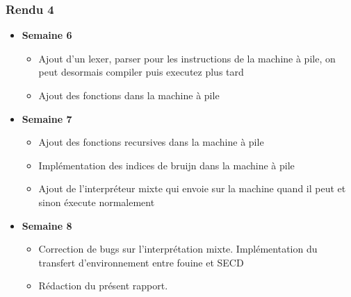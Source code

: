\subsubsection*{Rendu 4}
\begin{itemize}
  \item \textbf{Semaine 6 }
    \begin{itemize}
      \item Ajout d'un lexer, parser pour les instructions de la machine à pile, on peut desormais compiler puis executez plus tard
      \item Ajout des fonctions dans la machine à pile
    \end{itemize}
    
   \item \textbf{Semaine 7 }
    \begin{itemize}
   \item Ajout des fonctions recursives dans la machine à pile
   \item Implémentation des indices de bruijn dans la machine à pile
   \item Ajout de l'interpréteur mixte qui envoie sur la machine quand il peut et sinon éxecute normalement
    \end{itemize} 
    
    \item \textbf{Semaine 8} 
    \begin{itemize}
    \item Correction de bugs sur l'interprétation mixte. Implémentation du transfert d'environnement entre fouine et SECD
    \item Rédaction du présent rapport.
   \end{itemize}
\end{itemize}